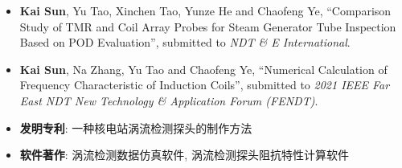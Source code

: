 \begin{itemize}
    \item \textbf{Kai Sun}, Yu Tao, Xinchen Tao, Yunze He and Chaofeng Ye,
          ``Comparison Study of TMR and Coil Array Probes for Steam Generator Tube Inspection Based on POD Evaluation'',
          submitted to \emph{NDT \& E International}.\\
          { \footnotesize {}}
    \item \textbf{Kai Sun}, Na Zhang, Yu Tao and Chaofeng Ye,
          ``Numerical Calculation of Frequency Characteristic of Induction Coils'',
          submitted to \emph{2021 IEEE Far East NDT New Technology \& Application Forum (FENDT)}.\\
          { \footnotesize {}}
    \item \textbf{发明专利}: 一种核电站涡流检测探头的制作方法
    \item \textbf{软件著作}: 涡流检测数据仿真软件, 涡流检测探头阻抗特性计算软件
\end{itemize}